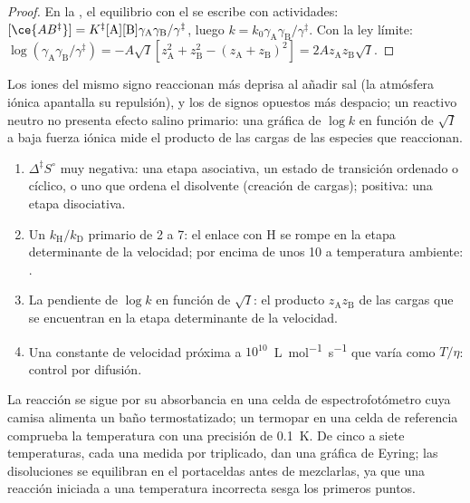 \begin{proof}
En la , el equilibrio con el  se escribe
con actividades: $[\ce{AB^{\ddagger}}] = K^{\ddagger}[\mathrm A][\mathrm B]\gamma_{\mathrm A}\gamma_{\mathrm B}/\gamma^{\ddagger}$, luego $k = k_0\gamma_{\mathrm A}\gamma_{\mathrm B}/\gamma^{\ddagger}$.
Con la ley límite: $\log(\gamma_{\mathrm A}\gamma_{\mathrm B}/\gamma^{\ddagger}) = -A\sqrt I[z_{\mathrm A}^2 + z_{\mathrm B}^2 - (z_{\mathrm A} + z_{\mathrm B})^2] =
2Az_{\mathrm A}z_{\mathrm B}\sqrt I$.
\end{proof}

Los iones del mismo signo reaccionan más deprisa al añadir sal (la atmósfera iónica
apantalla su repulsión), y los de signos opuestos más despacio; un reactivo neutro no
presenta efecto salino primario: una gráfica de $\log k$ en función de $\sqrt I$ a baja
fuerza iónica mide el producto de las cargas de las especies que reaccionan.

\begin{method}\label{met:b3:rate-theories:mechanism-evidence}
\begin{enumerate}
  \item $\Delta^{\ddagger}S^\circ$ muy negativa: una etapa asociativa, un estado de transición ordenado o
        cíclico, o uno que ordena el disolvente (creación de cargas);
        positiva: una etapa disociativa.
  \item Un $k_{\mathrm H}/k_{\mathrm D}$ primario de 2 a 7: el enlace con H se rompe en la
        etapa determinante de la velocidad; por encima de unos 10 a temperatura ambiente: .
  \item La pendiente de $\log k$ en función de $\sqrt I$: el producto $z_{\mathrm A}z_{\mathrm B}$ de las cargas que se
        encuentran en la etapa determinante de la velocidad.
  \item Una constante de velocidad próxima a $10^{10}$~\unit{L.mol^{-1}.s^{-1}} que varía como $T/\eta$:
        control por difusión.
\end{enumerate}
\end{method}

\begin{inthelab}
La reacción se sigue por su absorbancia en una celda de espectrofotómetro cuya
camisa alimenta un baño termostatizado; un termopar en una celda de referencia comprueba
la temperatura con una precisión de \qty{0.1}{K}. De cinco a siete temperaturas, cada una medida por
triplicado, dan una gráfica de Eyring; las disoluciones se equilibran en el
portaceldas antes de mezclarlas, ya que una reacción iniciada a una temperatura incorrecta sesga
los primeros puntos.
\end{inthelab}

